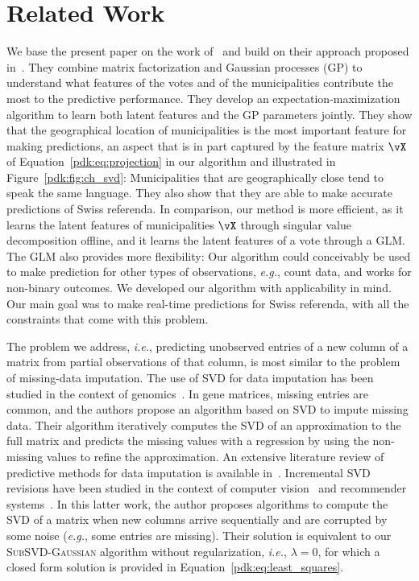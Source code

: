 \section{Related Work}%
\label{pdk:sec:relwork}

We base the present paper on the work of~\citet{etter2014mining} and build on their approach proposed in~\cite{etter2016online}.
They combine matrix factorization and Gaussian processes (GP) to understand what features of the votes and of the municipalities contribute the most to the predictive performance.
They develop an expectation-maximization algorithm to learn both latent features and the GP parameters jointly.
They show that the geographical location of municipalities is the most important feature for making predictions, an aspect that is in part captured by the feature matrix $\vX$ of Equation~\eqref{pdk:eq:projection} in our algorithm and illustrated in Figure~\ref{pdk:fig:ch_svd}:
Municipalities that are geographically close tend to speak the same language.
They also show that they are able to make accurate predictions of Swiss referenda.
In comparison, our method is more efficient, as it learns the latent features of municipalities $\vX$ through singular value decomposition offline, and it learns the latent features of a vote through a GLM.
The GLM also provides more flexibility:
Our algorithm could conceivably be used to make prediction for other types of observations, \textit{e.g.}, count data, and works for non-binary outcomes.
We developed our algorithm with applicability in mind.
Our main goal was to make real-time predictions for Swiss referenda, with all the constraints that come with this problem.

The problem we address, \textit{i.e.}, predicting unobserved entries of a new column of a matrix from partial observations of that column, is most similar to the problem of missing-data imputation.
The use of SVD for data imputation has been studied in the context of genomics~\citep{troyanskaya2001missing,hastie1999imputing}.
In gene matrices, missing entries are common, and the authors propose an algorithm based on SVD to impute missing data.
Their algorithm iteratively computes the SVD of an approximation to the full matrix and predicts the missing values with a regression by using the non-missing values to refine the approximation.
An extensive literature review of predictive methods for data imputation is available in~\citet{bertsimas2017predictive}.
Incremental SVD revisions have been studied in the context of computer vision~\citep{brand2002incremental} and recommender systems~\citep{brand2003fast}.
In this latter work, the author proposes algorithms to compute the SVD of a matrix when new columns arrive sequentially and are corrupted by some noise (\textit{e.g.}, some entries are missing).
Their solution is equivalent to our \textsc{SubSVD-Gaussian} algorithm without regularization, \textit{i.e.}, $\lambda=0$, for which a closed form solution is provided in Equation~\eqref{pdk:eq:least_squares}.

